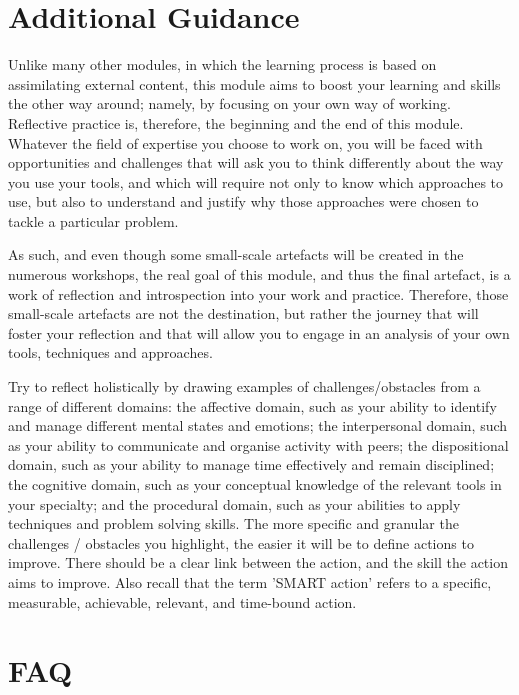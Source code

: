 \documentclass{../../fal_assignment}
\begin{document}
\section*{Additional Guidance}

Unlike many other modules, in which the learning process is based on assimilating external content, this module aims to boost your learning and skills the other way around; namely, by focusing on your own way of working. Reflective practice is, therefore, the beginning and the end of this module. Whatever the field of expertise you choose to work on, you will be faced with opportunities and challenges that will ask you to think differently about the way you use your tools, and which will require not only to know which approaches to use, but also to understand and justify why those approaches were chosen to tackle a particular problem.

As such, and even though some small-scale artefacts will be created in the numerous workshops, the real goal of this module, and thus the final artefact, is a work of reflection and introspection into your work and practice. Therefore, those small-scale artefacts are not the destination, but rather the journey that will foster your reflection and that will allow you to engage in an analysis of your own tools, techniques and approaches.

Try to reflect holistically by drawing examples of challenges/obstacles from a range of different domains: the affective domain, such as your ability to identify and manage different mental states and emotions; the interpersonal domain, such as your ability to communicate and organise activity with peers; the dispositional domain, such as your ability to manage time effectively and remain disciplined; the cognitive domain, such as your conceptual knowledge of the relevant tools in your specialty; and the procedural domain, such as your abilities to apply techniques and problem solving skills. The more specific and granular the challenges / obstacles you highlight, the easier it will be to define actions to improve. There should be a clear link between the action, and the skill the action aims to improve. Also recall that the term ’SMART action’ refers to a specific, measurable, achievable, relevant, and time-bound action.

\pagebreak
\section*{FAQ}
\end{document}
